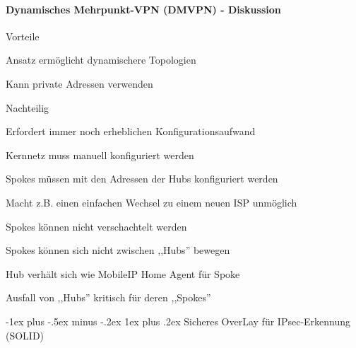 \documentclass[a4paper]{article}
\makeatletter
\renewcommand{\subsubsection}{\@startsection{subsubsection}{3}{0mm}%
 {-1ex plus -.5ex minus -.2ex}%
 {1ex plus .2ex}%
 {\normalfont\small\bfseries}}
\makeatother
\begin{document}
\begin{multicols}{3}
\begin{itemize*}
            \paragraph{Dynamisches Mehrpunkt-VPN (DMVPN) -
                  Diskussion}

            \begin{itemize*}
                  \item
                  Vorteile

                  \begin{itemize*}
                        \item Ansatz ermöglicht dynamischere Topologien
                        \item Kann private Adressen verwenden
                  \end{itemize*}
                  \item
                  Nachteilig

                  \begin{itemize*}
                        \item Erfordert immer noch erheblichen Konfigurationsaufwand
                        \begin{itemize*} \item Kernnetz muss manuell konfiguriert werden \item Spokes müssen mit den Adressen der Hubs konfiguriert werden \item Macht z.B. einen einfachen Wechsel zu einem neuen ISP unmöglich \end{itemize*}
                        \item Spokes können nicht verschachtelt werden
                        \item Spokes können sich nicht zwischen ,,Hubs'' bewegen
                        \begin{itemize*} \item Hub verhält sich wie MobileIP Home Agent für Spoke \end{itemize*}
                        \item Ausfall von ,,Hubs'' kritisch für deren ,,Spokes''
                  \end{itemize*}
            \end{itemize*}


            \subsubsection{Sicheres OverLay für IPsec-Erkennung
                  (SOLID)}


\end{itemize*}
\end{multicols}
\end{document}
